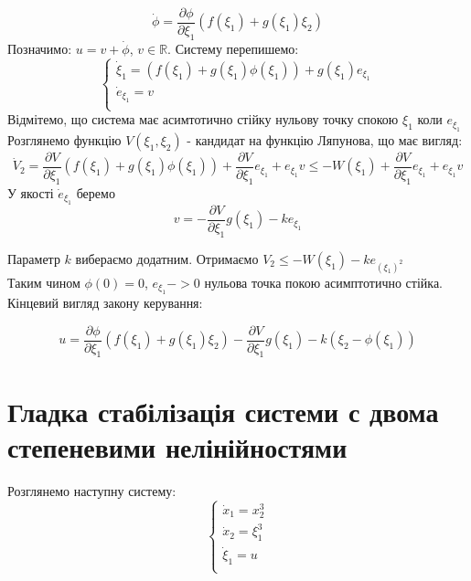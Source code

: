 \documentclass{article}
\begin{document}
\begin{equation}
    \dot\phi = \frac{\partial \phi}{\partial \xi_1}(f(\xi_1)+g(\xi_1)\xi_2)
\end{equation}
Позначимо: $u = v + \dot\phi$, $v \in \mathbb{R}$.
Систему перепишемо:
\begin{equation}
    \begin{cases}
        \dot \xi_1 = (f(\xi_1)+g(\xi_1)\phi(\xi_1))+g(\xi_1)e_{\xi_1}\\
        \dot e_{\xi_1} = v\\
    \end{cases}
\end{equation}
Відмітемо, що система має асимтотично стійку нульову точку спокою $\xi_1$ коли $e_{\xi_1}$
Розглянемо функцію $V(\xi_1,\xi_2)$ - кандидат на функцію Ляпунова, що має вигляд:
\begin{equation}
    \dot V_2 = \frac{\partial V}{\partial \xi_1}(f(\xi_1)+g(\xi_1)\phi(\xi_1))+
    \frac{\partial V}{\partial \xi_1}e_{\xi_1}+e_{\xi_1}v \leq -W(\xi_1)+
    \frac{\partial V}{\partial \xi_1}e_{\xi_1}+e_{\xi_1}v
\end{equation}
У якості $\dot e_{\xi_1}$ беремо 
\begin{equation}
    v = - \frac{\partial V}{\partial \xi_1}g(\xi_1) - ke_{\xi_1}
\end{equation}

Параметр $k$ вибераємо додатним.
Отримаємо $V_2 \leq -W(\xi_1) - ke_{(\xi_1)^2}$ \\
Таким чином $\phi(0)=0$, $e_{\xi_1} -> 0$ нульова точка покою асимптотично стійка.
Кінцевий вигляд закону керування:

\begin{equation}
    u = \frac{\partial \phi}{\partial \xi_1}(f(\xi_1)+g(\xi_1)\xi_2)-
    \frac{\partial V}{\partial \xi_1}g(\xi_1)-k(\xi_2-\phi(\xi_1))
\end{equation}
\pagebreak

\section{Гладка стабілізація системи с двома степеневими нелінійностями}
Розглянемо наступну систему:
\begin{equation}\label{Mar12}
    \begin{cases}
    \dot x_1 = x_2^3 \\
    \dot x_2 = \xi_1^3\\
    \dot \xi_1 = u\\
    \end{cases}
\end{equation}
\end{document}
